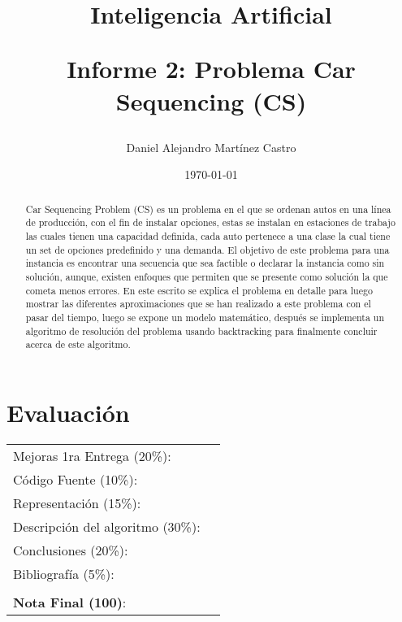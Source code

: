 \documentclass[letter, 10pt]{article}
\begin{document}
\title{Inteligencia Artificial \\ \begin{Large}Informe 2: Problema Car Sequencing (CS)\end{Large}}
\author{Daniel Alejandro Mart\'inez Castro}
\date{\today}
\maketitle


\section*{Evaluaci\'on}

\begin{tabular}{ll}
Mejoras 1ra Entrega (20\%): &  \underline{\hspace{2cm}}\\
C\'odigo Fuente (10\%): &  \underline{\hspace{2cm}}\\
Representaci\'on (15\%):  & \underline{\hspace{2cm}} \\
Descripci\'on del algoritmo (30\%):  & \underline{\hspace{2cm}} \\
Conclusiones (20\%): &  \underline{\hspace{2cm}}\\
Bibliograf\'ia (5\%): & \underline{\hspace{2cm}}\\
 &  \\
\textbf{Nota Final (100)}:   & \underline{\hspace{2cm}}
\end{tabular}

\begin{abstract}
Car Sequencing Problem (CS) es un problema en el que se ordenan autos en una l\'inea de producci\'on, con el fin de instalar opciones, estas se instalan en estaciones de trabajo las cuales tienen una capacidad definida, cada auto pertenece a una clase la cual tiene un set de opciones predefinido y una demanda. El objetivo de este problema para una instancia es encontrar una secuencia que sea factible o declarar la instancia como sin soluci\'on, aunque, existen enfoques que permiten que se presente como soluci\'on la que cometa menos errores. En este escrito se explica el problema en detalle para luego mostrar las diferentes aproximaciones que se han realizado a este problema con el pasar del tiempo, luego se expone un modelo matem\'atico, despu\'es se implementa un algoritmo de resoluci\'on del problema usando backtracking para finalmente concluir acerca de este algoritmo. 
\end{abstract}
\end{document}
